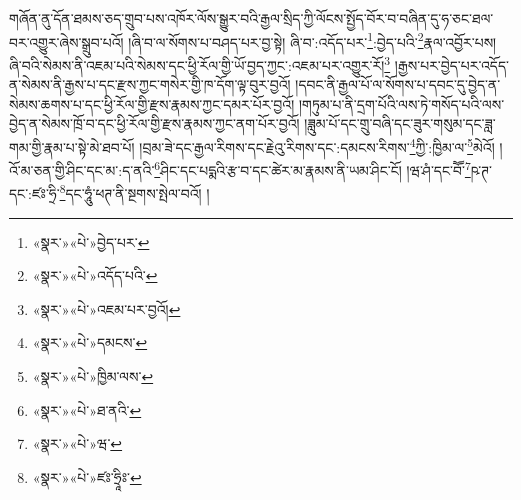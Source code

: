 གཞོན་ནུ་དོན་ཐམས་ཅད་གྲུབ་པས་འཁོར་ལོས་སྒྱུར་བའི་རྒྱལ་སྲིད་ཀྱི་ལོངས་སྤྱོད་བོར་བ་བཞིན་དུ་ཧ་ཅང་ཐལ་བར་འགྱུར་ཞེས་སྒྲུབ་པའོ། །ཞི་བ་ལ་སོགས་པ་བཤད་པར་བྱ་སྟེ། ཞི་བ་:འདོད་པར་\footnote{«སྣར་»«པེ་»བྱེད་པར་}:བྱེད་པའི་\footnote{«སྣར་»«པེ་»འདོད་པའི་}རྣལ་འབྱོར་པས། ཞི་བའི་སེམས་ནི་འཇམ་པའི་སེམས་དང་ཕྱི་རོལ་གྱི་ཡོ་བྱད་ཀྱང་:འཇམ་པར་འགྱུར་རོ།\footnote{«སྣར་»«པེ་»འཇམ་པར་བྱའོ།} །རྒྱས་པར་བྱེད་པར་འདོད་ན་སེམས་ནི་རྒྱས་པ་དང་རྫས་ཀྱང་གསེར་གྱི་ཁ་དོག་ལྟ་བུར་བྱའོ། །དབང་ནི་རྒྱལ་པོ་ལ་སོགས་པ་དབང་དུ་བྱེད་ན་སེམས་ཆགས་པ་དང་ཕྱི་རོལ་གྱི་རྫས་རྣམས་ཀྱང་དམར་པོར་བྱའོ། །གཏུམ་པ་ནི་དྲག་པོའི་ལས་ཏེ་གསོད་པའི་ལས་བྱེད་ན་སེམས་ཁྲོ་བ་དང་ཕྱི་རོལ་གྱི་རྫས་རྣམས་ཀྱང་ནག་པོར་བྱའོ། །ཟླུམ་པོ་དང་གྲུ་བཞི་དང་ཟུར་གསུམ་དང་ཟླ་གམ་གྱི་རྣམ་པ་སྟེ་མེ་ཐབ་པོ། །བྲམ་ཟེ་དང་རྒྱལ་རིགས་དང་རྗེའུ་རིགས་དང་:དམངས་རིགས་\footnote{«སྣར་»«པེ་»དམངས་}ཀྱི་:ཁྱིམ་ལ་\footnote{«སྣར་»«པེ་»ཁྱིམ་ལས་}མེའོ། །འོ་མ་ཅན་གྱི་ཤིང་དང་མ་:ད་ནའི་\footnote{«སྣར་»«པེ་»ཐ་ནའི་}ཤིང་དང་པདྨའི་རྩ་བ་དང་ཚེར་མ་རྣམས་ནི་ཡམ་ཤིང་ངོ། །ཝ་ཤཾ་དང་བཽ་\footnote{«སྣར་»«པེ་»ཝ་}ཥ་ཊ་དང་:ཛཿ་ཧྲི་\footnote{«སྣར་»«པེ་»ཛཿ་ཧྲཱིཿ་}དང་ཧཱུཾ་ཕཊ་ནི་སྔགས་སྤེལ་བའོ། །
